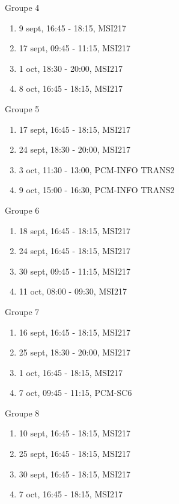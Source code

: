 \documentclass[
  a4paper,
  DIV=11,
  numbers=noendperiod,
  oneside]{scrreprt}
\providecommand{\tightlist}{%
  \setlength{\itemsep}{0pt}\setlength{\parskip}{0pt}}\usepackage{longtable,booktabs,array}
\begin{document}
Groupe 4

\begin{enumerate}
\def\labelenumi{\arabic{enumi}.}
\tightlist
\item
  9 sept, 16:45 - 18:15, MSI217
\item
  17 sept, 09:45 - 11:15, MSI217
\item
  1 oct, 18:30 - 20:00, MSI217
\item
  8 oct, 16:45 - 18:15, MSI217
\end{enumerate}

Groupe 5

\begin{enumerate}
\def\labelenumi{\arabic{enumi}.}
\tightlist
\item
  17 sept, 16:45 - 18:15, MSI217
\item
  24 sept, 18:30 - 20:00, MSI217
\item
  3 oct, 11:30 - 13:00, PCM-INFO TRANS2
\item
  9 oct, 15:00 - 16:30, PCM-INFO TRANS2
\end{enumerate}

Groupe 6

\begin{enumerate}
\def\labelenumi{\arabic{enumi}.}
\tightlist
\item
  18 sept, 16:45 - 18:15, MSI217
\item
  24 sept, 16:45 - 18:15, MSI217
\item
  30 sept, 09:45 - 11:15, MSI217
\item
  11 oct, 08:00 - 09:30, MSI217
\end{enumerate}

Groupe 7

\begin{enumerate}
\def\labelenumi{\arabic{enumi}.}
\tightlist
\item
  16 sept, 16:45 - 18:15, MSI217
\item
  25 sept, 18:30 - 20:00, MSI217
\item
  1 oct, 16:45 - 18:15, MSI217
\item
  7 oct, 09:45 - 11:15, PCM-SC6
\end{enumerate}

Groupe 8

\begin{enumerate}
\def\labelenumi{\arabic{enumi}.}
\tightlist
\item
  10 sept, 16:45 - 18:15, MSI217
\item
  25 sept, 16:45 - 18:15, MSI217
\item
  30 sept, 16:45 - 18:15, MSI217
\item
  7 oct, 16:45 - 18:15, MSI217
\end{enumerate}
\end{document}
